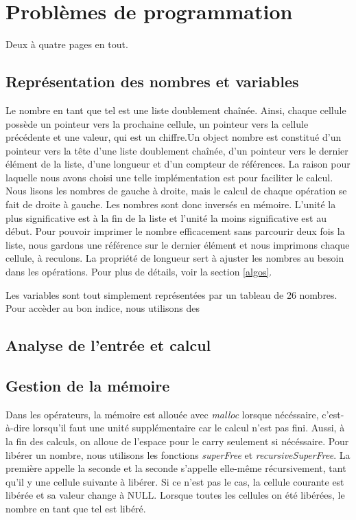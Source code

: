 \documentclass[letterpaper,12pt]{scrartcl}
\begin{document}
	
    
	\section{Problèmes de programmation}
        Deux à quatre pages en tout.
        
		\subsection{Représentation des nombres et variables}
		Le nombre en tant que tel est une liste doublement chaînée. Ainsi, chaque cellule possède un pointeur vers la prochaine cellule, un pointeur vers la cellule précédente et une valeur, qui est un chiffre.Un object nombre est constitué d'un pointeur vers la tête d'une liste doublement chaînée, d'un pointeur vers le dernier élément de la liste, d'une longueur et d'un compteur de références. La raison pour laquelle nous avons choisi une telle implémentation est pour faciliter le calcul. Nous lisons les nombres de gauche à droite, mais le calcul de chaque opération se fait de droite à gauche. Les nombres sont donc inversés en mémoire. L'unité la plus significative est à la fin de la liste et l'unité la moins significative est au début. Pour pouvoir imprimer le nombre efficacement sans parcourir deux fois la liste, nous gardons une référence sur le dernier élément et nous imprimons chaque cellule, à reculons. La propriété de longueur sert à ajuster les nombres au besoin dans les opérations. Pour plus de détails, voir la section \ref{algos}.

		Les variables sont tout simplement représentées par un tableau de 26 nombres. Pour accèder au bon indice, nous utilisons des 
        
        \subsection{Analyse de l'entrée et calcul}
            
        
        \subsection{Gestion de la mémoire}
        Dans les opérateurs, la mémoire est allouée avec \textit{malloc} lorsque nécéssaire, c'est-à-dire lorsqu'il faut une unité supplémentaire car le calcul n'est pas fini. Aussi, à la fin des calculs, on alloue de l'espace pour le carry seulement si nécéssaire. Pour libérer un nombre, nous utilisons les fonctions \textit{superFree} et \textit{recursiveSuperFree}. La première appelle la seconde et la seconde s'appelle elle-même récursivement, tant qu'il y une cellule suivante à libérer. Si ce n'est pas le cas, la cellule courante est libérée et sa valeur change à NULL. Lorsque toutes les cellules on été libérées, le nombre en tant que tel est libéré.
         
\end{document}
